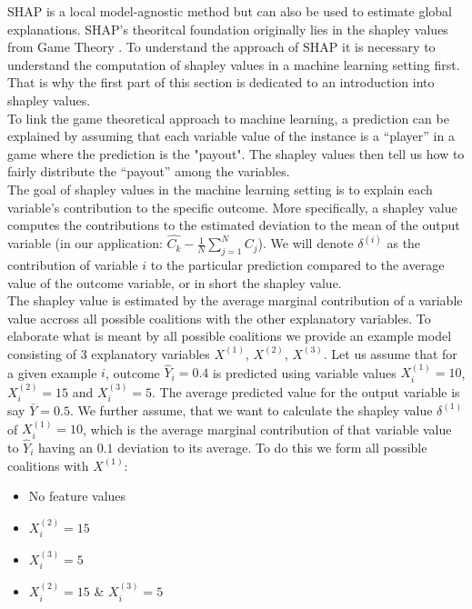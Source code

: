 \documentclass[12pt,titlepage]{article}
\begin{document}
\vspace{3mm}
SHAP is a local model-agnostic method but can also be used to estimate global explanations. SHAP's theoritcal foundation originally lies in the shapley values from Game Theory \cite{shapley}. To understand the approach of SHAP it is necessary to understand the computation of shapley values in a machine learning setting first. That is why the first part of this section is dedicated to an introduction into shapley values. \\
To link the game theoretical approach to machine learning, a prediction can be explained by assuming that each variable value of the instance is a “player” in a game where the prediction is the "payout". The shapley values then tell us how to fairly distribute the “payout” among the variables. \\
The goal of shapley values in the machine learning setting is to explain each variable's contribution to the specific outcome. More specifically, a shapley value computes the contributions to the estimated deviation to the mean of the output variable (in our application: $\hat{C_{k}} - \frac{1}{N} \sum_{j=1}^{N} C_{j}$). We will denote $\delta^{(i)}$ as the contribution of variable $i$ to the particular prediction compared to the average value of the outcome variable, or in short the shapley value. \\
The shapley value is estimated by the average marginal contribution of a variable value accross all possible coalitions with the other explanatory variables. To elaborate what is meant by all possible coalitions we provide an example model consisting of 3 explanatory variables $X^{(1)}$, $X^{(2)}$, $X^{(3)}$. Let us assume that for a given example $i$, outcome $\hat{Y}_{i}=0.4$ is predicted using variable values $X^{(1)}_{i}=10$, $X^{(2)}_{i}=15$ and $X^{(3)}_{i}=5$. The average predicted value for the output variable is say $\bar Y = 0.5$. We further assume, that we want to calculate the shapley value $\delta^{(1)}$ of $X^{(1)}_{i}=10$, which is the average marginal contribution of that variable value to $\hat{Y}_{i}$ having an $0.1$ deviation to its average. To do this we form all possible coalitions with $X^{(1)}$:
\begin{itemize}
    \item No feature values
    \item $X^{(2)}_{i}=15$
    \item $X^{(3)}_{i}=5$
    \item $X^{(2)}_{i}=15$ \& $X^{(3)}_{i}=5$
\end{itemize}
\end{document}
